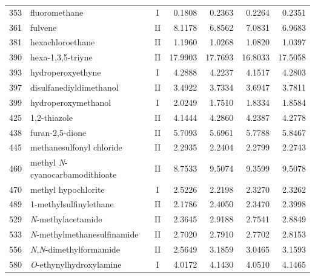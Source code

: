 \begin{longtable}{rlcd{2.5}d{2.5}d{2.5}d{2.5}}
    353  & fluoromethane                                          & I  & 0.1808  & 0.2363  & 0.2264  & 0.2351  \\
    361  & fulvene                                                & II & 8.1178  & 6.8562  & 7.0831  & 6.9683  \\
    381  & hexachloroethane                                       & II & 1.1960  & 1.0268  & 1.0820  & 1.0397  \\
    390  & hexa-1,3,5-triyne                                      & II & 17.9903 & 17.7693 & 16.8033 & 17.5058 \\
    393  & hydroperoxyethyne                                      & I  & 4.2888  & 4.2237  & 4.1517  & 4.2803  \\
    397  & disulfanediyldimethanol                                & II & 3.4922  & 3.7334  & 3.6947  & 3.7811  \\
    399  & hydroperoxymethanol                                    & I  & 2.0249  & 1.7510  & 1.8334  & 1.8584  \\
    425  & 1,2-thiazole                                           & II & 4.1444  & 4.2860  & 4.2387  & 4.2778  \\
    438  & furan-2,5-dione                                        & II & 5.7093  & 5.6961  & 5.7788  & 5.8467  \\
    445  & methanesulfonyl chloride                               & II & 2.2935  & 2.2404  & 2.2799  & 2.2743  \\
    460  & methyl \textit{N}-cyanocarbamodithioate                & II & 8.7533  & 9.5074  & 9.3599  & 9.5078  \\
    470  & methyl hypochlorite                                    & I  & 2.5226  & 2.2198  & 2.3270  & 2.3262  \\
    489  & 1-methylsulfinylethane                                 & II & 2.1786  & 2.4050  & 2.3470  & 2.3998  \\
    529  & \textit{N}-methylacetamide                             & II & 2.3645  & 2.9188  & 2.7541  & 2.8849  \\
    533  & \textit{N}-methylmethanesulfinamide                    & II & 2.7020  & 2.7910  & 2.7702  & 2.8153  \\
    556  & \textit{N},\textit{N}-dimethylformamide                & II & 2.5649  & 3.1859  & 3.0465  & 3.1593  \\
    580  & \textit{O}-ethynylhydroxylamine                        & I  & 4.0172  & 4.1430  & 4.0510  & 4.1465  \\

\end{longtable}

